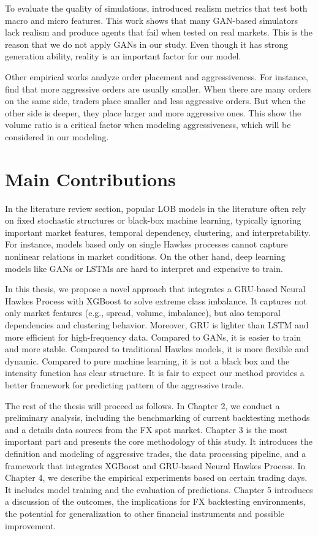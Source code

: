 To evaluate the quality of simulations, \cite{vyetrenko_get_2019} introduced realism metrics that test both macro and micro features. This work shows that many GAN-based simulators lack realism and produce agents that fail when tested on real markets. This is the reason that we do not apply GANs in our study. Even though it has strong generation ability, reality is an important factor for our model.

Other empirical works analyze order placement and aggressiveness. For instance, \cite{lo_order_2010} find that more aggressive orders are usually smaller. When there are many orders on the same side, traders place smaller and less aggressive orders. But when the other side is deeper, they place larger and more aggressive ones. This show the volume ratio is a critical factor when modeling aggressiveness, which will be considered in our modeling.


\section{Main Contributions}
In the literature review section, popular LOB models in the literature often rely on fixed stochastic structures or black-box machine learning, typically ignoring important market features, temporal dependency, clustering, and interpretability. For instance, models based only on single Hawkes processes cannot capture nonlinear relations in market conditions. On the other hand, deep learning models like GANs or LSTMs are hard to interpret and expensive to train.

In this thesis, we propose a novel approach that integrates a GRU-based Neural Hawkes Process with XGBoost to solve extreme class imbalance. It captures not only market features (e.g., spread, volume, imbalance), but also temporal dependencies and clustering behavior. Moreover, GRU is lighter than LSTM and more efficient for high-frequency data. Compared to GANs, it is easier to train and more stable. Compared to traditional Hawkes models, it is more flexible and dynamic. Compared to pure machine learning, it is not a black box and the intensity function has clear structure. It is fair to expect our method provides a better framework for predicting pattern of the aggressive trade.

The rest of the thesis will proceed as follows. In Chapter 2, we conduct a preliminary analysis, including the benchmarking of current backtesting methods and a details data sources from the FX spot market. Chapter 3 is the most important part and presents the core methodology of this study. It introduces the definition and modeling of aggressive trades, the data processing pipeline, and a framework that integrates XGBoost and GRU-based Neural Hawkes Process. In Chapter 4, we describe the empirical experiments based on certain trading days. It includes model training and the evaluation of predictions. Chapter 5 introduces a discussion of the outcomes, the implications for FX backtesting environments, the potential for generalization to other financial instruments and possible improvement.